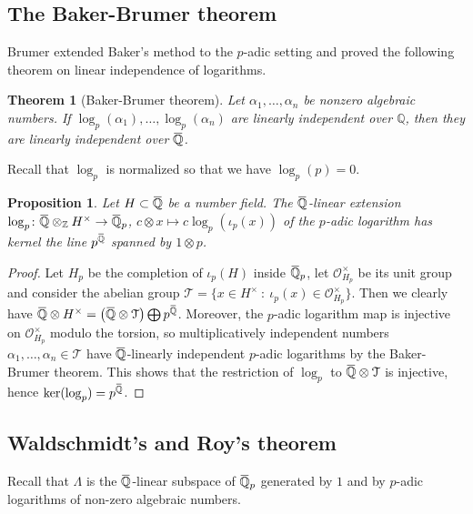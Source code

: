 \documentclass[12pt]{amsart}
\newcommand{\Q}{\mathbb{Q}}
\newcommand\bZ{\mathbb{Z}}
\newcommand\bQ{\mathbb{Q}}
\newcommand\cO{\mathcal{O}}
\newcommand\cT{\mathcal{T}}
\newcommand{\ob}[1]{\mkern 1.5mu\overline{\mkern-1.5mu#1\mkern-1.5mu}\mkern 1.5mu}
\theoremstyle{defstyle}
\theoremstyle{thmstyle}
\newtheorem{theorem}[subsubsection]{Theorem}
\newtheorem{proposition}[subsubsection]{Proposition}
\begin{document}
	\subsection{The Baker-Brumer theorem}
	Brumer \cite{brumer} extended Baker's method to the $p$-adic setting and proved the following theorem on linear independence of logarithms.
	\begin{theorem}[Baker-Brumer theorem]
		Let $\alpha_1,\ldots,\alpha_n$ be nonzero algebraic numbers. If $\log_p(\alpha_1),\ldots,\log_p(\alpha_n)$ are linearly independent over $\bQ$, then they are linearly independent over $\ob{\bQ}$. 
	\end{theorem}
	Recall that $\log_p$ is normalized so that we have $\log_p(p)=0$.
	\begin{proposition}\label{prop:log_p_almost_injective}
		Let $H\subset \ob{\bQ}$ be a number field. The $\ob{\bQ}$-linear extension $\log_p \colon \ob{\bQ} \otimes_\bZ H^\times \rightarrow \ob{\bQ}_p$, $c\otimes x \mapsto c\log_p(\iota_p(x))$ of the $p$-adic logarithm has kernel the line $p^{\ob{\bQ}}$ spanned by $1\otimes p$.
	\end{proposition}
	\begin{proof}
		Let $H_p$ be the completion of $\iota_p(H)$ inside $\ob{\Q}_p$, let $\cO^\times_{H_p}$ be its unit group and consider the abelian group $\cT=\{x\in H^\times \ \colon\ \iota_p(x)\in \cO_{H_p}^\times\}$. Then we clearly have $\ob{\bQ}\otimes H^\times = \left(\ob{\bQ} \otimes \cT\right) \bigoplus p^{\ob{\bQ}}$. Moreover, the $p$-adic logarithm map is injective on $\cO_{H_p}^\times$ modulo the torsion, so multiplicatively independent numbers $\alpha_1,\ldots,\alpha_n\in \cT$ have $\ob{\bQ}$-linearly independent $p$-adic logarithms by the Baker-Brumer theorem. This shows that the restriction of $\log_p$ to $\ob{\bQ} \otimes \cT$ is injective, hence $\ker (\log_p) = p^{\ob{\bQ}}$.
	\end{proof}
	\subsection{Waldschmidt's and Roy's theorem}
	Recall that $\Lambda$ is the $\ob{\bQ}$-linear subspace of $ \ob{\bQ}_p$ generated by $1$ and by $p$-adic logarithms of non-zero algebraic numbers. 
	
\end{document}
